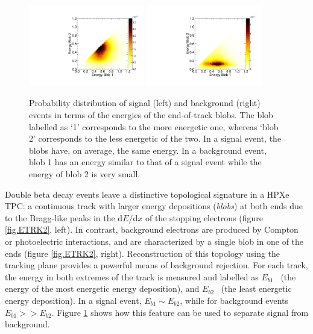 \documentclass{JINST}
\begin{document}
\begin{figure}[!htb]
\centering
\includegraphics[width=0.45\textwidth]{img/EnergyBlobsSignal.pdf}
\includegraphics[width=0.45\textwidth]{img/EnergyBlobsTl208.pdf}
\caption{Probability distribution of signal (left) and background (right) events in terms of the energies of the end-of-track blobs. The blob labelled as `1' corresponds to the more energetic one, whereas `blob 2' corresponds to the less energetic of the two. In a signal event, the blobs have, on average, the same energy. In a background event, blob 1 has an energy similar to that of a signal event while the energy of blob 2 is very small.} \label{fig.BLOBS}
\end{figure}

Double beta decay events leave a distinctive topological signature in a HPXe TPC: a continuous track with larger energy depositions (\emph{blobs}) at both ends due to the Bragg-like peaks in the d$E$/d$x$ of the stopping electrons (figure \ref{fig.ETRK2}, left). In contrast, background electrons are produced by Compton or photoelectric interactions, and are characterized by a single blob in one of the ends (figure \ref{fig.ETRK2}, right). Reconstruction of this topology using the tracking plane provides a powerful means of background rejection. For each track, the energy in both extremes of the track is measured and labelled as $E_{b1}$~ (the energy of the most energetic energy deposition), and $E_{b2}$~ (the least energetic energy deposition). In a signal event, $E_{b1} \sim E_{b2} $, while for background events $E_{b1} >> E_{b2} $. Figure \ref{fig.BLOBS} shows how this feature can be used to separate signal from background. 
\end{document}
